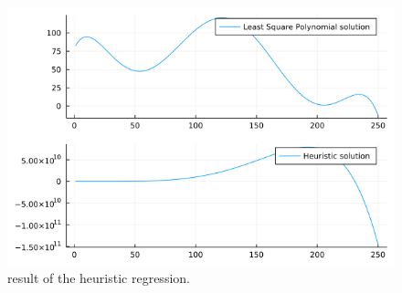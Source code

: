 \documentclass[12pt,a4paper]{article}
\begin{document}
\begin{figure}[H]
    \centering
    \includegraphics[scale=0.4]{../figs/methaeuristic_regression_result.png}
    \caption{result of the heuristic regression.}
    \label{fig:heuristic-regression}
\end{figure}



\end{document}

